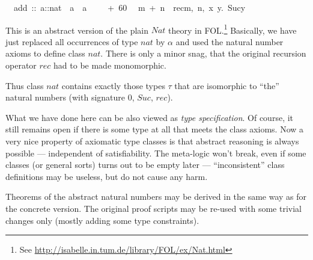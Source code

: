 \begin{isabelle}
\isanewline
{}\isanewline
\ \ add\ ::\ {\isachardoublequote}{\isacharprime}a::nat\ {\isasymRightarrow}\ {\isacharprime}a\ {\isasymRightarrow}\ {\isacharprime}a{\isachardoublequote}\ \ \ \ {\isacharparenleft}\ {\isachardoublequote}+{\isachardoublequote}\ 60{\isacharparenright}\isanewline
\ \ {\isachardoublequote}m\ +\ n\ {\isasymequiv}\ rec{\isacharparenleft}m,\ n,\ {\isasymlambda}x\ y.\ Suc{\isacharparenleft}y{\isacharparenright}{\isacharparenright}{\isachardoublequote}%
\begin{isamarkuptext}%
This is an abstract version of the plain $Nat$ theory in
 FOL.\footnote{See
 \url{http://isabelle.in.tum.de/library/FOL/ex/Nat.html}} Basically,
 we have just replaced all occurrences of type $nat$ by $\alpha$ and
 used the natural number axioms to define class $nat$.  There is only
 a minor snag, that the original recursion operator $rec$ had to be
 made monomorphic.

 Thus class $nat$ contains exactly those types $\tau$ that are
 isomorphic to ``the'' natural numbers (with signature $0$, $Suc$,
 $rec$).

 \medskip What we have done here can be also viewed as \emph{type
 specification}.  Of course, it still remains open if there is some
 type at all that meets the class axioms.  Now a very nice property of
 axiomatic type classes is that abstract reasoning is always possible
 --- independent of satisfiability.  The meta-logic won't break, even
 if some classes (or general sorts) turns out to be empty later ---
 ``inconsistent'' class definitions may be useless, but do not cause
 any harm.

 Theorems of the abstract natural numbers may be derived in the same
 way as for the concrete version.  The original proof scripts may be
 re-used with some trivial changes only (mostly adding some type
 constraints).%
\end{isamarkuptext}%
\end{isabelle}%
